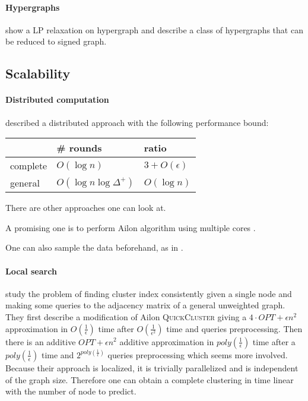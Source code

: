 \paragraph{Hypergraphs} \Textcite{Kim2011} show a LP relaxation on hypergraph
and \textcite{Ricatte13} describe a class of hypergraphs that can be reduced
to signed graph.

\subsection{Scalability}
\paragraph{Distributed computation}
\Textcite{Chierichetti2014} described a distributed approach with the
following performance bound:

\begin{tabular}{lll}
	\toprule
	& \# rounds  & ratio \\
	\midrule
	complete & $O(\log n)$ & $3 + O(\epsilon)$ \\
	general & $O(\log n\log{\Delta^+})$ & $O(\log{n})$ \\
	\bottomrule
\end{tabular}

There are other approaches \autocite[Part III]{bonchi2014correlation} one can
look at.

A promising one is to perform Ailon algorithm using multiple cores
\autocite{Pan2014}.

One can also sample the data beforehand, as in \autocite{Bertolacci07}.

\paragraph{Local search}
\Textcite{Bonchi2013} study the problem of finding cluster index consistently
given a single node and making some queries to the adjacency matrix of a
general unweighted graph. They first describe a modification of Ailon
\textsc{QuickCluster} giving a $4\cdot OPT + \epsilon n^2$ approximation in
$O(\frac{1}{\epsilon})$ time after $O(\frac{1}{\epsilon^2})$ time and queries
preprocessing. Then there is an additive $OPT + \epsilon n^2$ additive
approximation in $poly(\frac{1}{\epsilon})$ time after a
$poly(\frac{1}{\epsilon})$ time and $2^{poly(\frac{1}{\epsilon})}$ queries
preprocessing which seems more involved.  Because their approach is localized,
it is trivially parallelized and is independent of the graph size. Therefore
one can obtain a complete clustering in time linear with the number of node to
predict.
